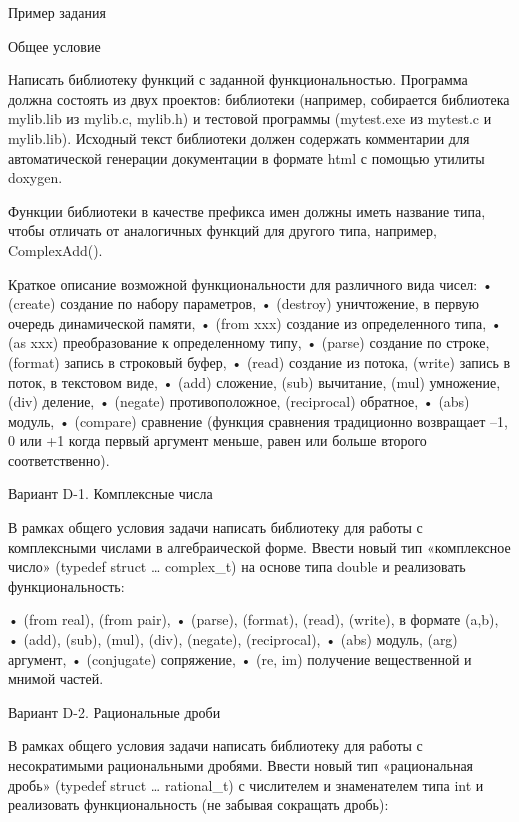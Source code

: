Пример задания

Общее условие

Написать библиотеку функций с заданной функциональностью. Программа должна
состоять из двух проектов: библиотеки (например, собирается библиотека
mylib.lib из mylib.c, mylib.h) и тестовой программы (mytest.exe из mytest.c и
mylib.lib). Исходный текст библиотеки должен содержать комментарии для
автоматической генерации документации в формате html с помощью утилиты
doxygen.

Функции библиотеки в качестве префикса имен должны иметь название типа, чтобы
отличать от аналогичных функций для другого типа, например, ComplexAdd().

Краткое описание возможной функциональности для различного вида чисел:
•	(create) создание по набору параметров,
•	(destroy) уничтожение, в первую очередь динамической памяти,
•	(from xxx) создание из определенного типа,
•	(as xxx) преобразование к определенному типу,
•	(parse) создание по строке, (format) запись в строковый буфер,
•	(read) создание из потока, (write) запись в поток, в текстовом виде,
•	(add) сложение, (sub) вычитание, (mul) умножение, (div) деление,
•	(negate) противоположное, (reciprocal) обратное,
•	(abs) модуль,
•	(compare) сравнение (функция сравнения традиционно возвращает –1, 0 или +1 когда первый аргумент меньше, равен или больше второго соответственно).


Вариант D-1. Комплексные числа

В рамках общего условия задачи написать библиотеку для работы с комплексными
числами в алгебраической форме. Ввести новый тип «комплексное число» (typedef
struct … complex_t) на основе типа double и реализовать функциональность:

•	(from real), (from pair),
•	(parse), (format), (read), (write), в формате (a,b),
•	(add), (sub), (mul), (div), (negate), (reciprocal),
•	(abs) модуль, (arg) аргумент,
•	(conjugate) сопряжение,
•	(re, im) получение вещественной и мнимой частей.


Вариант D-2. Рациональные дроби

В рамках общего условия задачи написать библиотеку для работы с несократимыми
рациональными дробями. Ввести новый тип «рациональная дробь» (typedef struct …
rational_t) с числителем и знаменателем типа int и реализовать
функциональность (не забывая сокращать дробь):

